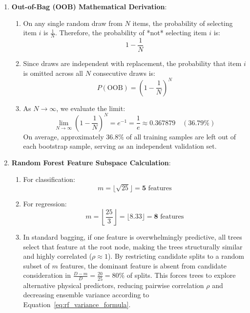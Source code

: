 \begin{enumerate}
    \item \textbf{Out-of-Bag (OOB) Mathematical Derivation}:
    \begin{enumerate}[label=(\alph*)]
        \item On any single random draw from $N$ items, the probability of selecting item $i$ is $\frac{1}{N}$. Therefore, the probability of *not* selecting item $i$ is:
        \begin{equation*}
        1 - \frac{1}{N}
        \end{equation*}
        \item Since draws are independent with replacement, the probability that item $i$ is omitted across all $N$ consecutive draws is:
        \begin{equation*}
        P(\text{OOB}) = \left( 1 - \frac{1}{N} \right)^N
        \end{equation*}
        \item As $N \to \infty$, we evaluate the limit:
        \begin{equation*}
        \lim_{N \to \infty} \left( 1 - \frac{1}{N} \right)^N = e^{-1} = \frac{1}{e} \approx \mathbf{0.367879} \quad (\mathbf{36.79\%})
        \end{equation*}
        On average, approximately $36.8\%$ of all training samples are left out of each bootstrap sample, serving as an independent validation set.
    \end{enumerate}

    \item \textbf{Random Forest Feature Subspace Calculation}:
    \begin{enumerate}[label=(\alph*)]
        \item For classification:
        \begin{equation*}
        m = \lfloor \sqrt{25} \rfloor = \mathbf{5} \text{ features}
        \end{equation*}
        \item For regression:
        \begin{equation*}
        m = \left\lfloor \frac{25}{3} \right\rfloor = \lfloor 8.33 \rfloor = \mathbf{8} \text{ features}
        \end{equation*}
        \item In standard bagging, if one feature is overwhelmingly predictive, all trees select that feature at the root node, making the trees structurally similar and highly correlated ($\rho \approx 1$). 
        By restricting candidate splits to a random subset of $m$ features, the dominant feature is absent from candidate consideration in $\frac{D - m}{D} = \frac{20}{25} = 80\%$ of splits. This forces trees to explore alternative physical predictors, reducing pairwise correlation $\rho$ and decreasing ensemble variance according to Equation~\eqref{eq:rf_variance_formula}.
    \end{enumerate}


\end{enumerate}
